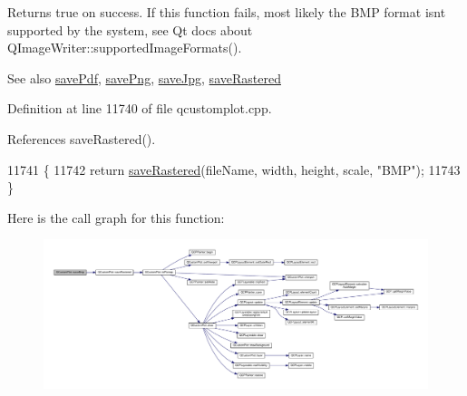 Returns true on success. If this function fails, most likely the B\+M\+P format isn\textquotesingle{}t supported by the system, see Qt docs about Q\+Image\+Writer\+::supported\+Image\+Formats().

\begin{DoxySeeAlso}{See also}
\hyperlink{class_q_custom_plot_a632da44c6d94ea8b271eb483b08b5114}{save\+Pdf}, \hyperlink{class_q_custom_plot_a7636261aff1f6d25c9da749ece3fc8b8}{save\+Png}, \hyperlink{class_q_custom_plot_a490c722092d1771e8ce4a7a73dfd84ab}{save\+Jpg}, \hyperlink{class_q_custom_plot_ab528b84cf92baabe29b1d0ef2f77c93e}{save\+Rastered} 
\end{DoxySeeAlso}


Definition at line 11740 of file qcustomplot.\+cpp.



References save\+Rastered().


\begin{DoxyCode}
11741                                         \{
11742   \textcolor{keywordflow}{return} \hyperlink{class_q_custom_plot_ab528b84cf92baabe29b1d0ef2f77c93e}{saveRastered}(fileName, width, height, scale, \textcolor{stringliteral}{"BMP"});
11743 \}
\end{DoxyCode}


Here is the call graph for this function\+:\nopagebreak
\begin{figure}[H]
\begin{center}
\leavevmode
\includegraphics[width=350pt]{class_q_custom_plot_a6629d9e8e6da4bf18055ee0257fdce9a_cgraph}
\end{center}
\end{figure}


\hypertarget{class_q_custom_plot_a490c722092d1771e8ce4a7a73dfd84ab}{}
